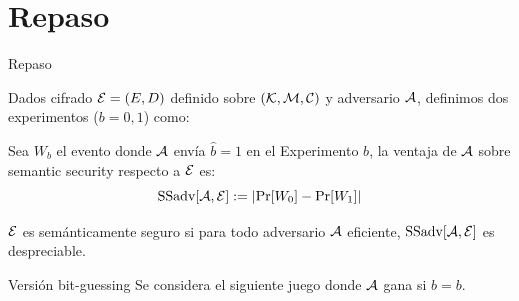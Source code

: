 \section{Repaso}
\begin{frame}[allowframebreaks]{Repaso}
  \begin{definition}
    Dados cifrado $\mathcal{E} = (E, D)$ definido sobre $(\mathcal{K}, \mathcal{M}, \mathcal{C})$ y adversario $\mathcal{A}$, definimos dos 
    experimentos ($b = 0,1$) como:

    \begin{centering}
    \end{centering}

    Sea $W_b$ el evento donde $\mathcal{A}$ envía $\hat{b} = 1$ en el Experimento $b$, la ventaja de $\mathcal{A}$
    sobre semantic security respecto a $\mathcal{E}$ es:
    \begin{equation*}
      \text{SSadv}[\mathcal{A}, \mathcal{E}] := \left|\text{Pr}[W_0] - \text{Pr}[W_1]\right|
    \end{equation*}
  \end{definition}

  \begin{definition}
    $\mathcal{E}$ es semánticamente seguro si para todo adversario $\mathcal{A}$ eficiente, $\text{SSadv}[\mathcal{A}, \mathcal{E}]$
    es despreciable.
  \end{definition}

  \begin{alertblock}{Versión bit-guessing}
    Se considera el siguiente juego donde $\mathcal{A}$ gana si $\hat{b} = b$.

    \begin{centering}
\end{centering}
\end{alertblock}
\end{frame}
